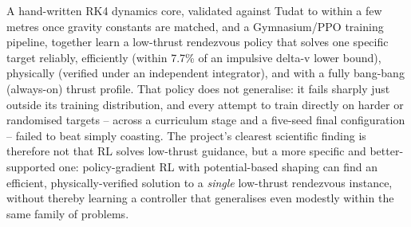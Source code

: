 A hand-written RK4 dynamics core, validated against Tudat to within a few metres once gravity
constants are matched, and a Gymnasium/PPO training pipeline, together learn a low-thrust
rendezvous policy that solves one specific target reliably, efficiently (within 7.7\% of an
impulsive delta-v lower bound), physically (verified under an independent integrator), and with a
fully bang-bang (always-on) thrust profile. That policy does not generalise: it fails sharply just
outside its training distribution, and every attempt to train directly on harder or randomised
targets -- across a curriculum stage and a five-seed final configuration -- failed to beat simply
coasting. The project's clearest scientific finding is therefore not that RL solves low-thrust
guidance, but a more specific and better-supported one: policy-gradient RL with potential-based
shaping can find an efficient, physically-verified solution to a \emph{single} low-thrust
rendezvous instance, without thereby learning a controller that generalises even modestly within
the same family of problems.
